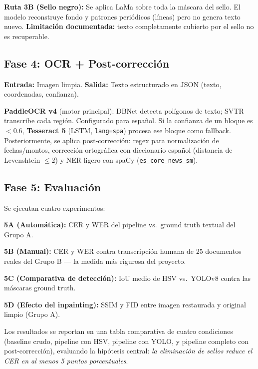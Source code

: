 \documentclass[11pt, a4paper]{article}
\begin{document}
\textbf{Ruta 3B (Sello negro):} Se aplica LaMa sobre toda la máscara del sello. El modelo reconstruye fondo y patrones periódicos (líneas) pero no genera texto nuevo. \textbf{Limitación documentada:} texto completamente cubierto por el sello no es recuperable.

\subsection{Fase 4: OCR + Post-corrección}

\textbf{Entrada:} Imagen limpia. \textbf{Salida:} Texto estructurado en JSON (texto, coordenadas, confianza).

\textbf{PaddleOCR v4} (motor principal): DBNet detecta polígonos de texto; SVTR transcribe cada región. Configurado para español. Si la confianza de un bloque es $< 0.6$, \textbf{Tesseract 5} (LSTM, \texttt{lang=spa}) procesa ese bloque como fallback. Posteriormente, se aplica post-corrección: regex para normalización de fechas/montos, corrección ortográfica con diccionario español (distancia de Levenshtein $\leq 2$) y NER ligero con spaCy (\texttt{es\_core\_news\_sm}).

\subsection{Fase 5: Evaluación}

Se ejecutan cuatro experimentos:

\textbf{5A (Automática):} CER y WER del pipeline vs.\ ground truth textual del Grupo A.

\textbf{5B (Manual):} CER y WER contra transcripción humana de 25 documentos reales del Grupo B --- la medida más rigurosa del proyecto.

\textbf{5C (Comparativa de detección):} IoU medio de HSV vs.\ YOLOv8 contra las máscaras ground truth.

\textbf{5D (Efecto del inpainting):} SSIM y FID entre imagen restaurada y original limpio (Grupo A).

Los resultados se reportan en una tabla comparativa de cuatro condiciones (baseline crudo, pipeline con HSV, pipeline con YOLO, y pipeline completo con post-corrección), evaluando la hipótesis central: \textit{la eliminación de sellos reduce el CER en al menos 5 puntos porcentuales}.

\end{document}
